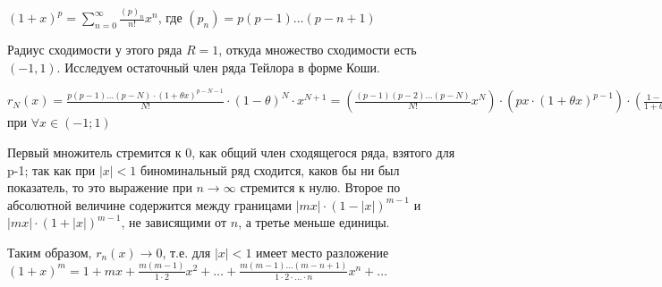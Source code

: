 \documentclass[a4paper, fleqn]{article}
\begin{document}
    $(1 + x)^p = \sum_{n=0}^\infty \frac{(p)_n}{n!} x^n$, где $(p_n) = p(p-1) \dots (p-n+1)$

    Радиус сходимости у этого ряда $R = 1$, откуда множество сходимости есть $(-1, 1)$.
    Исследуем остаточный член ряда Тейлора в форме Коши.

    $r_N(x) = \frac{p(p-1)\dots(p-N) \cdot (1 + \theta x)^{p - N - 1}}{N!} \cdot (1 - \theta)^N \cdot 
    x^{N+1} = \left(\frac{(p-1) (p-2) \dots (p - N)}{N!} x^N \right) \cdot \left(px \cdot (1 + \theta x)^{p - 1}\right)
    \cdot \left(\frac{1 - \theta}{1 + \theta x}\right)^N \xrightarrow[]{N \to \infty} 0$ при 
    $\forall x \in (-1; 1)$

    Первый множитель стремится к 0, как общий член сходящегося ряда, взятого для p-1; так как при
    $|x| < 1$ биноминальный ряд сходится, каков бы ни был показатель, то это выражение при
    $n \to \infty$ стремится к нулю. Второе по абсолютной величине содержится между границами
    $|mx| \cdot (1  - |x|)^{m-1}$ и $|mx| \cdot (1 + |x|)^{m-1}$, не зависящими от $n$, а третье меньше единицы.

    Таким образом, $r_n(x) \to 0$, т.е. для $|x| < 1$ имеет место разложение $\displaystyle (1+x)^m = 1
    + mx + \frac{m(m-1)}{1 \cdot 2}x^2 + \dots + \frac{m(m-1)\dots(m-n+1)}{1 \cdot 2 \cdot \dots \cdot n}x^n
    + \dots$
        
\end{document}
